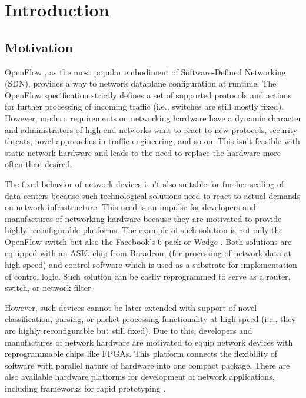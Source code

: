 \chapter{Introduction}
\label{chap:introduction}

\section{Motivation}


OpenFlow \cite{openflow}, as the most popular embodiment of Software-Defined Networking (SDN), provides a way
to network dataplane configuration at runtime. The OpenFlow specification strictly defines a set of supported protocols 
and actions for further processing of incoming traffic (i.e., switches are still mostly fixed). 
However, modern requirements on networking hardware have a dynamic
character and administrators of high-end networks want to react to new protocols, security threats,
novel approaches in traffic engineering, and so on. 
This isn't feasible with static network hardware and leads to the need to replace the hardware more often than desired.

The fixed behavior of network devices isn't also suitable for further scaling of data centers because such technological solutions 
need to react to actual demands on network infrastructure. This need is an impulse for developers and manufactures of networking
hardware because they are motivated to provide highly reconfigurable platforms. The example of such solution is not only the OpenFlow switch
but also the Facebook's 6-pack \cite{FacebookSixPack} or Wedge \cite{FacebookWedge}. Both solutions are equipped with an ASIC chip
from Broadcom (for processing of network data at high-speed) and control software which is used as a substrate for implementation
of control logic. Such solution can be easily reprogrammed to serve as a router, switch, or network filter.

However, such devices cannot be later extended with support of novel classification, parsing, or packet processing functionality
at high-speed (i.e., they are highly reconfigurable but still fixed). 
Due to this, developers and manufactures of network hardware are motivated to equip network devices with reprogrammable chips like FPGAs. 
This platform connects the flexibility of software with parallel nature of hardware into one
compact package. 
There are also available hardware platforms \cite{combo-100g} for development of network applications, including frameworks for rapid 
prototyping \cite{NetCOPEWeb}.


